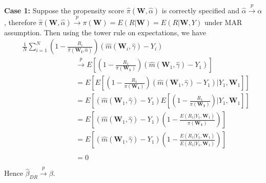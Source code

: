 \documentclass[12pt,twoside]{article}
\begin{document}
\textbf{Case 1:} Suppose the propensity score $\hat\pi(\mathbf{W},\hat{\alpha})$ is correctly specified and $\hat{\alpha} \xrightarrow{p} \alpha$, therefore  $\hat\pi(\mathbf{W},\hat{\alpha}) \xrightarrow{p} \pi(\mathbf{W}) = E(R|\mathbf{W}) = E(R|\mathbf{W}, Y)$ under MAR assumption. Then using the tower rule on expectations, we have
\begin{align*}
& \frac{1}{N}\sum_{i=1}^{N}\left(1 - \frac{R_i}{\hat\pi(\mathbf{W_i},\hat{\alpha})} \right) (\hat m(\mathbf{W}_i, \hat\gamma)-Y_i) \\
     & \phantom{E [(1 - \frac{R_1}{\pi(\mathbf{W_1})})} \xrightarrow{p} E \left[\left(1 - \frac{R_1}{\pi(\mathbf{W_1})} \right) (\hat m(\mathbf{W}_1, \hat\gamma)-Y_1)\right]  \\
     & \phantom{E [(1 - \frac{R_1}{\pi(\mathbf{W_1})})} = E\left[E\left[\left(1 - \frac{R_1}{\pi(\mathbf{W_1})} \right) (\hat m(\mathbf{W}_1, \hat\gamma)-Y_1)|Y_1, \mathbf{W}_1\right]\right] \\
     & \phantom{E [(1 - \frac{R_1}{\pi(\mathbf{W_1})})} = E\left[ (\hat m(\mathbf{W}_1, \hat\gamma)-Y_1)E\left[\left(1 - \frac{R_1}{\pi(\mathbf{W_1})} \right)|Y_1, \mathbf{W}_1\right]\right] \\
     & \phantom{E [(1 - \frac{R_1}{\pi(\mathbf{W_1})})} = E\left[ (\hat m(\mathbf{W}_1, \hat\gamma)-Y_1)\left(1 - \frac{E(R_1|Y_1, \mathbf{W}_1)}{\pi(\mathbf{W_1})} \right)\right] \\
     & \phantom{E [(1 - \frac{R_1}{\pi(\mathbf{W_1})})} = E\left[ (\hat m(\mathbf{W}_1, \hat\gamma)-Y_1)\left(1 - \frac{E(R_1|Y_1, \mathbf{W}_1)}{E(R_1|Y_1, \mathbf{W}_1)} \right)\right] \\
     &  \phantom{E [(1 - \frac{R_1}{\pi(\mathbf{W_1})})} = 0
\end{align*}
Hence $\hat{\beta}_{DR} \xrightarrow{p} \beta$. \\
\end{document}
